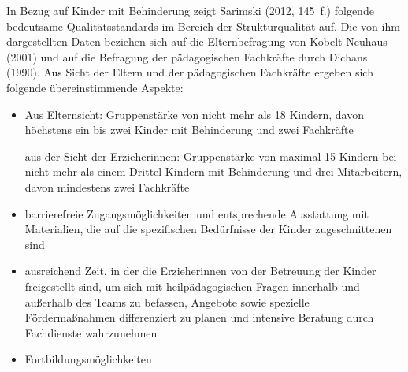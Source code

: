 In Bezug auf Kinder mit Behinderung zeigt Sarimski (2012, 145~f.) folgende bedeutsame Qualitätsstandards im Bereich der Strukturqualität auf. Die von ihm dargestellten Daten beziehen sich auf die Elternbefragung von Kobelt Neuhaus (2001) und auf die Befragung der pädagogischen Fachkräfte durch Dichans (1990). 
Aus Sicht der Eltern und der pädagogischen Fachkräfte ergeben sich folgende übereinstimmende Aspekte:
 
\begin{itemize}
\item Aus Elternsicht: Gruppenstärke von nicht mehr als 18 Kindern, davon höchstens ein bis zwei Kinder mit Behinderung und zwei Fachkräfte 

aus der Sicht der Erzieherinnen: Gruppenstärke von maximal 15 Kindern bei nicht mehr als einem Drittel Kindern mit Behinderung und drei Mitarbeitern, davon mindestens zwei Fachkräfte
\item barrierefreie Zugangsmöglichkeiten und entsprechende Ausstattung mit Materialien, die auf die spezifischen Bedürfnisse der Kinder zugeschnittenen sind
\item ausreichend Zeit, in der die Erzieherinnen von der Betreuung der Kinder freigestellt sind, um sich mit heilpädagogischen Fragen innerhalb und außerhalb des Teams zu befassen, Angebote sowie spezielle Fördermaßnahmen differenziert zu planen und intensive Beratung durch Fachdienste wahrzunehmen
\item Fortbildungsmöglichkeiten
\end{itemize}

